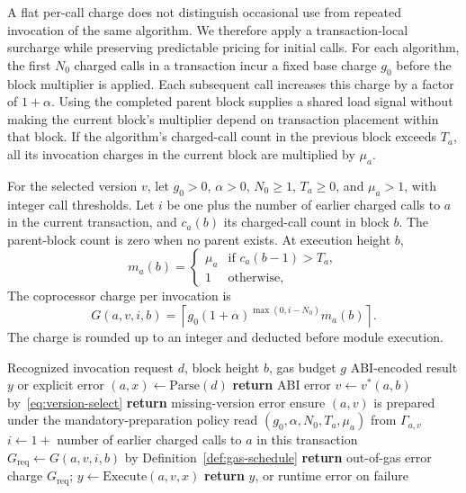 \documentclass[runningheads]{llncs}
\begin{document}
A flat per-call charge does not distinguish occasional use from repeated invocation of the same algorithm. We therefore apply a transaction-local surcharge while preserving predictable pricing for initial calls. For each algorithm, the first $N_0$ charged calls in a transaction incur a fixed base charge $g_0$ before the block multiplier is applied. Each subsequent call increases this charge by a factor of $1+\alpha$. Using the completed parent block supplies a shared load signal without making the current block's multiplier depend on transaction placement within that block. If the algorithm's charged-call count in the previous block exceeds $T_a$, all its invocation charges in the current block are multiplied by $\mu_a$.

\begin{definition}
\label{def:gas-schedule}
For the selected version $v$, let $g_0>0$, $\alpha>0$, $N_0\geq 1$, $T_a\geq 0$, and $\mu_a>1$, with integer call thresholds. Let $i$ be one plus the number of earlier charged calls to $a$ in the current transaction, and $c_a(b)$ its charged-call count in block $b$. The parent-block count is zero when no parent exists. At execution height $b$,
\begin{equation}
m_{a}(b)=
\begin{cases}
\mu_{a} & \text{if } c_{a}(b-1)>T_{a},\\
1 & \text{otherwise,}
\end{cases}
\label{eq:block-multiplier}
\end{equation}
The coprocessor charge per invocation is
\begin{equation}
G(a,v,i,b)=
\left\lceil g_0(1+\alpha)^{\max(0,i-N_0)} m_{a}(b)\right\rceil.
\label{eq:gas-schedule}
\end{equation}
The charge is rounded up to an integer and deducted before module execution.
\end{definition}

\begin{algorithm}[!htb]
\caption{\textbf{Contract-to-coprocessor invocation protocol.}}
\label{alg:invocation-protocol}
\begin{algorithmic}[1]
\Require Recognized invocation request $d$, block height $b$, gas budget $g$
\Ensure ABI-encoded result $y$ or explicit error
\State $(a,x)\gets\mathrm{Parse}(d)$
    \State \textbf{return} ABI error
\EndIf
\State $v\gets v^{*}(a,b)$ by~\eqref{eq:version-select}\label{line:resolve}
    \State \textbf{return} missing-version error\label{line:missing}
\EndIf
\State ensure $(a,v)$ is prepared under the mandatory-preparation policy\label{line:ensure}
\State read $(g_0,\alpha,N_0,T_a,\mu_a)$ from $\Gamma_{a,v}$
\State $i\gets 1+$ number of earlier charged calls to $a$ in this transaction
\State $G_{\mathrm{req}}\gets G(a,v,i,b)$ by Definition~\ref{def:gas-schedule}
    \State \textbf{return} out-of-gas error
\EndIf
\State charge $G_{\mathrm{req}}$; $y\gets\mathrm{Execute}(a,v,x)$\label{line:execute}
\State \textbf{return} $y$, or runtime error on failure
\end{algorithmic}
\end{algorithm}
\end{document}

